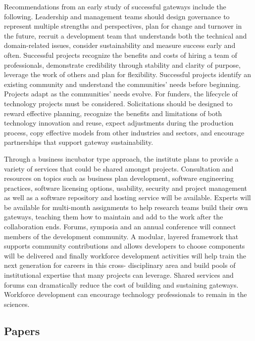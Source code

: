 \documentclass[11pt, oneside]{amsart}
\begin{document}
Recommendations from an early study of successful gateways include the
following. Leadership and management teams should design governance to
represent multiple strengths and perspectives, plan for change and turnover in
the future, recruit a development team that understands both the technical and
domain-related issues, consider sustainability and measure success early and
often. Successful projects recognize the benefits and costs of hiring a team of
professionals, demonstrate credibility through stability and clarity of
purpose, leverage the work of others and plan for flexibility. Successful
projects identify an existing community and understand the communities' needs
before beginning. Projects adapt as the communities' needs evolve. For funders,
the lifecycle of technology projects must be considered. Solicitations should
be designed to reward effective planning, recognize the benefits and
limitations of both technology innovation and reuse, expect adjustments during
the production process, copy effective models from other industries and
sectors, and encourage partnerships that support gateway sustainability.

Through a business incubator type approach, the institute plans to provide a
variety of services that could be shared amongst projects. Consultation and
resources on topics such as business plan development, software engineering
practices, software licensing options, usability, security and project
management as well as a software repository and hosting service will be
available. Experts will be available for multi-month assignments to help
research teams build their own gateways, teaching them how to maintain and add
to the work after the collaboration ends. Forums, symposia and an annual
conference will connect members of the development community. A modular,
layered framework that supports community contributions and allows developers
to choose components will be delivered and finally workforce development
activities will help train the next generation for careers in this cross-
disciplinary area and build pools of institutional expertise that many projects
can leverage. Shared services and forums can dramatically reduce the cost of
building and sustaining gateways. Workforce development can encourage
technology professionals to remain in the sciences.


\subsection*{Papers}
\end{document}

